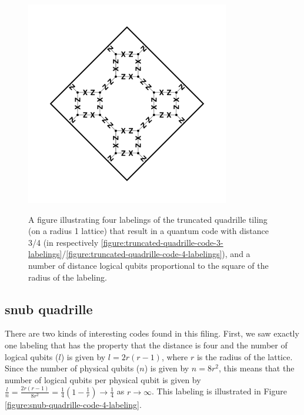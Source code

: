 \documentclass{amsbook}
\theoremstyle{plain}
\theoremstyle{definition}
\theoremstyle{remark}
\newcommand{\paren}[1]{\left(#1\right)}
\begin{document}
\begin{figure}
{\includegraphics[width=3.5in]{images/truncated-quadrille-code-4-labeling-2}}\\
\caption{
\label{figure:truncated-quadrille-code-labelings}
A figure illustrating four labelings of the truncated quadrille tiling (on a radius 1 lattice) that result in a quantum code with distance 3/4 (in respectively \ref{figure:truncated-quadrille-code-3-labelings}/\ref{figure:truncated-quadrille-code-4-labelings}), and a number of distance logical qubits proportional to the square of the radius of the labeling.
}
\end{figure}
\subsection{snub quadrille}


There are two kinds of interesting codes found in this filing.  First, we saw exactly one labeling that has the property that the distance is four and the number of logical qubits ($l$) is given by $l=2r(r-1)$, where $r$ is the radius of the lattice.  Since the number of physical qubits ($n$) is given by $n=8r^2$, this means that the number of logical qubits per physical qubit is given by $\frac{l}{n}=\frac{2r(r-1)}{8r^2}=\frac{1}{4}\paren{1-\frac{1}{r}}\to\frac{1}{4}$ as $r\to\infty$.  This labeling is illustrated in Figure \ref{figure:snub-quadrille-code-4-labeling}.
\end{document}
